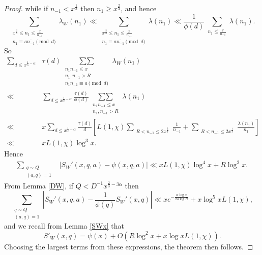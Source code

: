 \documentclass{amsart}
\begin{document}
\begin{proof}
while if $n_{-1}<x^\frac 13$ then $n_{1}\geq x^\frac 23$, and hence
$$\sum_{\substack{x^{\frac 23}\leq n_1\leq \frac x{n_{-1}} \\ n_{1}\equiv a\overline{n_{-1}}\pmod d}}\lambda_W(n_1)\ll \sum_{\substack{x^{\frac 23}\leq n_1\leq \frac x{n_{-1}} \\ n_{1}\equiv a\overline{n_{-1}}\pmod d}}\lambda(n_1)\ll  \frac 1{\phi(d)}\sum_{\substack{n_1\leq \frac x{n_{-1}} }}\lambda(n_1).$$
So
\begin{align*}
\sum_{d\leq x^{\frac 13-\alpha}} &\tau(d)\mathop{\sum\sum}\limits_{\substack{n_1n_{-1}\leq x \\ n_1,n_{-1}>R \\ n_1n_{-1}\equiv a\pmod d}}\lambda_W\left(n_1\right) \\
\ll &\sum_{d\leq x^{\frac 13-\alpha}} \frac{\tau(d)}{\phi(d)}\mathop{\sum\sum}\limits_{\substack{n_1n_{-1}\leq x \\ n_1,n_{-1}>R }}\lambda\left(n_1\right) \\
\ll &x\sum_{d\leq x^{\frac 13-\alpha}} \frac{\tau(d)}{d}\left[L(1,\chi)\mathop{\sum}\limits_{\substack{ R<n_{-1}\leq 2x^\frac 23}}\frac{1}{n_{-1}}+\mathop{\sum}\limits_{\substack{R<n_{-1}\leq 2x^\frac 13}}\frac{\lambda(n_1)}{n_{1}}\right]\\
\ll &xL(1,\chi)\log^{3} x.
\end{align*}
Hence
\begin{align*}
\sum_{\substack{q\sim Q  \\ (a,q)=1}}&\left|S_W'(x,q,a)-\psi(x,q,a)\right|\ll xL(1,\chi)\log^4 x+R\log^2 x.
\end{align*}
From Lemma \ref{DW}, if $Q<D^{-1}x^{\frac 23-3\alpha}$ then
$$\sum_{\substack{q\sim Q  \\ (a,q)=1}}\left|S_W'(x,q,a)-\frac{1}{\phi(q)}S_W'(x,q)\right|\ll xe^{-\frac{\alpha\log x}{24\log R}}+x\log^5 xL(1,\chi),$$
and we recall from Lemma \ref{SWx} that
$$S'_W(x,q)=\psi(x)+O\left(R\log^2 x+x\log xL(1,\chi)\right).$$
Choosing the largest terms from these expressions, the theorem then follows.
\end{proof}
\end{document}

